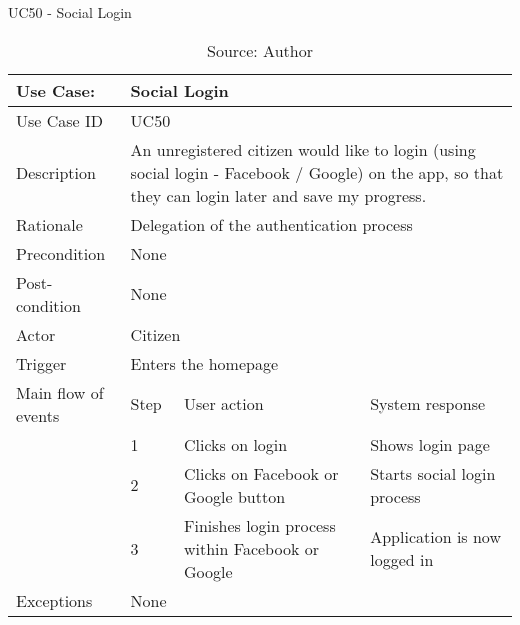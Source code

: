\begin{table}[ht]
\centering
\caption{UC50 - Social Login}
\label{uc:50}
\begin{tabular}{|p{3cm}|p{1cm}|p{5cm}|p{5cm}|}
\hline
Use Case:       & \multicolumn{3}{p{11cm}|}{Social Login} \\ \hline
Use Case ID     & \multicolumn{3}{p{11cm}|}{UC50} \\ \hline
Description     & \multicolumn{3}{p{11cm}|}{An unregistered citizen would like to login (using social login - Facebook / Google) on the app, so that they can login later and save my progress.} \\ \hline
Rationale       & \multicolumn{3}{p{11cm}|}{Delegation of the authentication process} \\ \hline
Precondition    & \multicolumn{3}{p{11cm}|}{None} \\ \hline
Post-condition  & \multicolumn{3}{p{11cm}|}{None} \\ \hline
Actor           & \multicolumn{3}{p{11cm}|}{Citizen} \\ \hline
Trigger         & \multicolumn{3}{p{11cm}|}{Enters the homepage} \\ \hline
Main flow of events & Step  & User action & System response \\ \hline
                    & 1     & Clicks on login & Shows login page \\ \hline
                    & 2     & Clicks on Facebook or Google button & Starts social login process \\ \hline
                    & 3     & Finishes login process within Facebook or Google & Application is now logged in \\ \hline
Exceptions      & \multicolumn{3}{p{11cm}|}{None} \\ \hline
\end{tabular}
\caption*{Source: Author}
\end{table}

